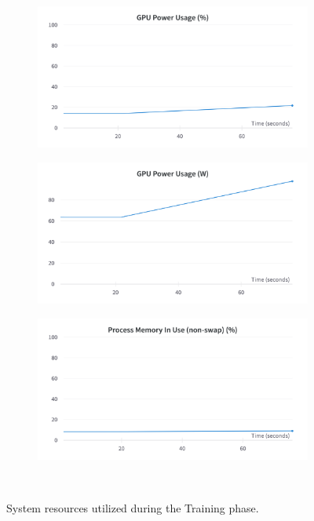 \begin{figure}[H]
\begin{subfigure}{0.32\textwidth}
	\end{subfigure}\\
	\begin{subfigure}{0.32\textwidth}
		\centering
		\includegraphics[width=\textwidth]{chapters/3_models/imgs/ufnc/ufncusageperc.png}
	\end{subfigure}
	\begin{subfigure}{0.32\textwidth}
		\centering
		\includegraphics[width=\textwidth]{chapters/3_models/imgs/ufnc/ufncusagew.png}
	\end{subfigure}
	\begin{subfigure}{0.32\textwidth}
		\centering
		\includegraphics[width=\textwidth]{chapters/3_models/imgs/ufnc/ufcnmemram.png}
	\end{subfigure}\\
	\caption{System resources utilized during the Training phase.}
	\label{fig:ufcnsysusage}
\end{figure}


